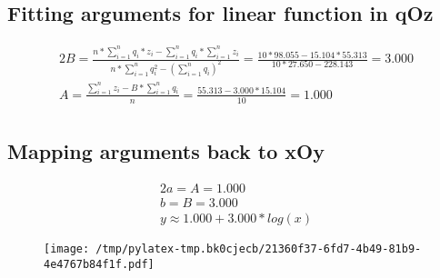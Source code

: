 \documentclass{article}%
\begin{document}
\subsection{Fitting arguments for linear function in qOz}%
\label{subsec:FittingargumentsforlinearfunctioninqOz}%
\begin{alignat*}{2}%
B
                    = \frac {n * \sum\limits_{i = 1}^n {q_i * z_i} - \sum\limits_{i = 1}^n {q_i} * \sum\limits_{i = 1}^n {z_i}}
                        {n * \sum\limits_{i = 1}^n {q_i^2} - (\sum\limits_{i = 1}^n {q_i}) ^ 2}
                    = \frac {10 * 98.055 - 15.104 * 55.313}
                        {10 * 27.650 - 228.143}
                    = 3.000 \\%
A
                    = \frac {\sum\limits_{i = 1}^n {z_i} - B * \sum\limits_{i = 1}^{n} {q_i}} n
                    = \frac {55.313 - 3.000 * 15.104} {10}
                    = 1.000 \\%
\end{alignat*}

%
\subsection{Mapping arguments back to xOy}%
\label{subsec:MappingargumentsbacktoxOy}%
\begin{alignat*}{2}%
a = A = 1.000 \\%
b = B = 3.000 \\%
y \approx1.000 + 3.000 * log(x)%
\end{alignat*}%


\begin{figure}[htbp]%
\centering%
\texttt{[image: /tmp/pylatex-tmp.bk0cjecb/21360f37-6fd7-4b49-81b9-4e4767b84f1f.pdf]}%
\end{figure}

%
\end{document}
